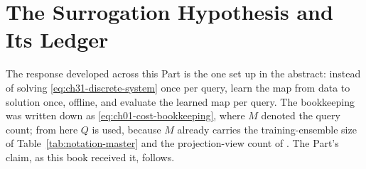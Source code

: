 \section{The Surrogation Hypothesis and Its Ledger}
\label{sec:ch31-hypothesis}

The response developed across this Part is the one
 set up in the abstract: instead of
solving \eqref{eq:ch31-discrete-system} once per query, learn the map from data to solution once,
offline, and evaluate the learned map per query. The bookkeeping was written down as
\eqref{eq:ch01-cost-bookkeeping}, where $M$ denoted the query count; from here $Q$ is used,
because $M$ already carries the training-ensemble size of Table~\ref{tab:notation-master} and the
projection-view count of
. The Part's claim, as this
book received it, follows.


